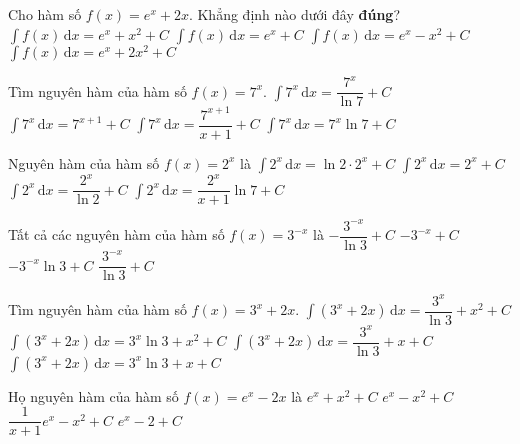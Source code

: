 \begin{ex}%
Cho hàm số $f(x)=e^x+2x$. Khẳng định nào dưới đây \textbf{đúng}?
\choice
{\True $\displaystyle\int f(x) \mathrm{\,d}x=e^{x}+x^2+C$}
{$\displaystyle\int f(x) \mathrm{\,d}x=e^{x}+C$}
{$\displaystyle\int f(x) \mathrm{\,d}x=e^{x}-x^2+C$}
{$\displaystyle\int f(x) \mathrm{\,d}x=e^{x}+2x^2+C$}
\end{ex}

\begin{ex}%
Tìm nguyên hàm của hàm số  $f(x)=7^x$.
\choice
{\True $\displaystyle\int 7^x \mathrm{\,d}x=\dfrac{7^x}{\ln 7}+C$}
{$\displaystyle\int 7^x \mathrm{\,d}x=7^{x+1}+C$}
{$\displaystyle\int 7^x \mathrm{\,d}x=\dfrac{7^{x+1}}{x+1}+C$}
{$\displaystyle\int 7^x \mathrm{\,d}x=7^x\ln 7+C$}
\end{ex}

\begin{ex}%
Nguyên hàm của hàm số  $f(x)=2^x$ là
\choice
{$\displaystyle\int 2^x \mathrm{\,d}x=\ln 2\cdot 2^x+C$}
{$\displaystyle\int 2^x \mathrm{\,d}x=2^x+C$}
{\True $\displaystyle\int 2^x \mathrm{\,d}x=\dfrac{2^{x}}{\ln 2}+C$}
{$\displaystyle\int 2^x \mathrm{\,d}x=\dfrac{2^x}{x+1}\ln 7+C$}
\end{ex}

\begin{ex}%
Tất cả các nguyên hàm của hàm số  $f(x)=3^{-x}$ là
\choice
{\True $-\dfrac{3^{-x}}{\ln 3}+C$}
{$-3^{-x}+C$}
{$-3^{-x}\ln 3+C$}
{$\dfrac{3^{-x}}{\ln 3}+C$}
\end{ex}

\begin{ex}%
Tìm nguyên hàm của hàm số $f(x)=3^x+2x$.
\choice
{\True $\displaystyle\int (3^x+2x) \mathrm{\,d}x=\dfrac{3^x}{\ln 3}+x^2+C$}
{$\displaystyle\int (3^x+2x) \mathrm{\,d}x=3^x\ln3+x^2+C$}
{$\displaystyle\int (3^x+2x) \mathrm{\,d}x=\dfrac{3^x}{\ln 3}+x+C$}
{$\displaystyle\int (3^x+2x) \mathrm{\,d}x=3^x\ln3+x+C$}
\end{ex}

\begin{ex}%
Họ nguyên hàm của hàm số $f(x)=e^x-2x$ là
\choice
{$e^x+x^2+C$}
{\True $e^x-x^2+C$}
{$\dfrac{1}{x+1}e^x-x^2+C$}
{$e^x-2+C$}
\end{ex}

